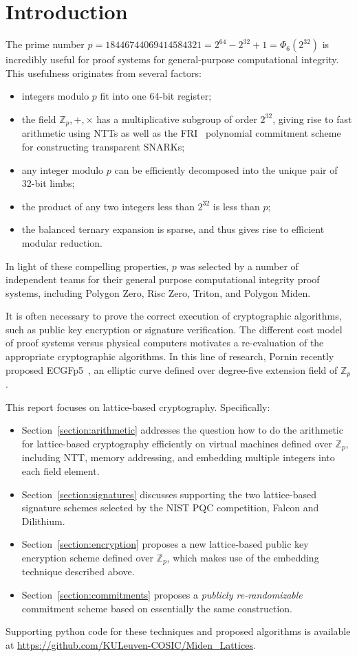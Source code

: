 \section{Introduction}

The prime number $p = 18446744069414584321 = 2^{64} - 2^{32} + 1 = \Phi_6(2^{32})$ is incredibly useful for proof systems for general-purpose computational integrity. This usefulness originates from several factors:
\begin{itemize}
 \item integers modulo $p$ fit into one 64-bit register;
 \item the field $\mathbb{Z}_p, +, \times$ has a multiplicative subgroup of order $2^{32}$, giving rise to fast arithmetic using NTTs as well as the FRI~\cite{fri} polynomial commitment scheme for constructing transparent SNARKs;
 \item any integer modulo $p$ can be efficiently decomposed into the unique pair of 32-bit limbs;
 \item the product of any two integers less than $2^{32}$ is less than $p$;
 \item the balanced ternary expansion is sparse, and thus gives rise to efficient modular reduction.
\end{itemize}
In light of these compelling properties, $p$ was selected by a number of independent teams for their general purpose computational integrity proof systems, including Polygon Zero, Risc Zero, Triton, and Polygon Miden.

It is often necessary to prove the correct execution of cryptographic algorithms, such as public key encryption or signature verification. The different cost model of proof systems versus physical computers motivates a re-evaluation of the appropriate cryptographic algorithms. In this line of research, Pornin recently proposed ECGFp5~\cite{ecgfp5}, an elliptic curve defined over degree-five extension field of $\mathbb{Z}_p$.

This report focuses on lattice-based cryptography. Specifically:
\begin{itemize}
\item Section~\ref{section:arithmetic} addresses the question how to do the arithmetic for lattice-based cryptography efficiently on virtual machines defined over $\mathbb{Z}_p$, including NTT, memory addressing, and embedding multiple integers into each field element.
\item Section~\ref{section:signatures} discusses supporting the two lattice-based signature schemes selected by the NIST PQC competition, Falcon and Dilithium.
\item Section~\ref{section:encryption} proposes a new lattice-based public key encryption scheme defined over $\mathbb{Z}_p$, which makes use of the embedding technique described above.
\item Section~\ref{section:commitments} proposes a \emph{publicly re-randomizable} commitment scheme based on essentially the same construction.
\end{itemize}
Supporting python code for these techniques and proposed algorithms is available at \url{https://github.com/KULeuven-COSIC/Miden_Lattices}.